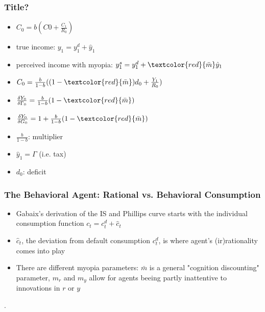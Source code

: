\documentclass{beamer}
\begin{document}
\begin{frame}
\frametitle{Title?}
\begin{itemize}
\item $C_{0}=b(C{0}+\frac {C_{1}}{R_{0}})$
\item true income: $y_{1}=y_{1}^{d}+\hat y_{1}$
\item perceived income with myopia: $y_{1}^{s}=y_{1}^{d}+\textcolor{red}{\bar m}\hat y_{1}$
\item $C_{0}=\frac {b}{1-b}((1- \textcolor{red}{\bar m})d_{0}+\frac {Y_{1}}{R_{0}})$
\item $\frac{\delta Y_{0}}{\delta \Gamma_{0}}=\frac{b}{1-b}(1-\textcolor{red}{\bar m})$
\item $\frac{\delta Y_{0}}{\delta G_{0}}=1+\frac{b}{1-b}(1-\textcolor{red}{\bar m})$
\item $\frac{b}{1-b}$: multiplier
\item $\hat y_{1}=\Gamma$ (i.e. tax)
\item $d_{0}$: deficit
\end{itemize}

\end{frame}


\begin{frame}
\frametitle{The Behavioral Agent: Rational vs. Behavioral Consumption}
\begin{itemize}
\item Gabaix's derivation of the IS and Phillips curve starts with the individual consumption function $c_{t}=c_{t}^{d}+\hat c_{t}$
\item  $\hat c_{t}$, the deviation from default consumption $c_{t}^{d}$, is where agent's (ir)rationality comes into play
\item There are different myopia parameters: $\bar m$ is a general "cognition discounting" parameter, $m_{r}$ and $m_{y}$ allow for agents beeing partly inattentive to innovations in $r$ or $y$

\end{itemize}.

\end{frame}

\end{document}
